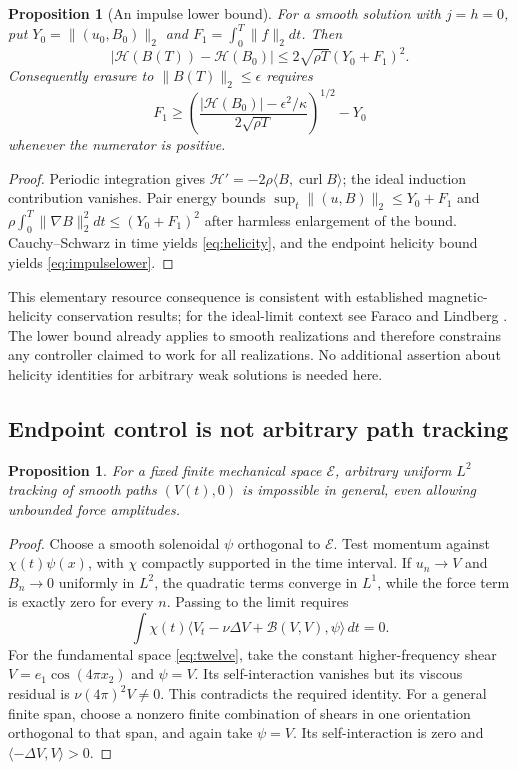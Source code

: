 \documentclass[11pt,a4paper]{amsart}
\newtheorem{proposition}[theorem]{Proposition}
\theoremstyle{definition}
\theoremstyle{remark}
\numberwithin{equation}{section}
\newcommand{\Bcal}{\mathcal B}
\newcommand{\ip}[2]{\langle #1,#2\rangle}
\newcommand{\norm}[1]{\lVert #1\rVert}
\newcommand{\curl}{\operatorname{curl}}
\begin{document}
\begin{proposition}[An impulse lower bound]\label{prop:helicity}
For a smooth solution with $j=h=0$, put
$Y_0=\norm{(u_0,B_0)}_2$ and $F_1=\int_0^T\norm f_2dt$. Then
\begin{equation}\label{eq:helicity}
 |\mathscr H(B(T))-\mathscr H(B_0)|
 \le2\sqrt{\rho T}(Y_0+F_1)^2.
\end{equation}
Consequently erasure to $\norm{B(T)}_2\le\epsilon$ requires
\begin{equation}\label{eq:impulselower}
 F_1\ge
 \left(\frac{|\mathscr H(B_0)|-\epsilon^2/\kappa}
                   {2\sqrt{\rho T}}\right)^{1/2}-Y_0
\end{equation}
whenever the numerator is positive.
\end{proposition}

\begin{proof}
Periodic integration gives
$\mathscr H'=-2\rho\ip B{\curl B}$; the ideal induction contribution vanishes. Pair energy bounds $\sup_t\norm{(u,B)}_2\le Y_0+F_1$ and
$\rho\int_0^T\norm{\nabla B}_2^2dt\le(Y_0+F_1)^2$ after harmless enlargement of the bound. Cauchy--Schwarz in time yields \eqref{eq:helicity}, and the endpoint helicity bound yields \eqref{eq:impulselower}.
\end{proof}

This elementary resource consequence is consistent with established magnetic-helicity conservation results; for the ideal-limit context see Faraco and Lindberg \cite{FL}. The lower bound already applies to smooth realizations and therefore constrains any controller claimed to work for all realizations. No additional assertion about helicity identities for arbitrary weak solutions is needed here.

\subsection{Endpoint control is not arbitrary path tracking}
\begin{proposition}\label{prop:tracking}
For a fixed finite mechanical space $\mathcal E$, arbitrary uniform $L^2$ tracking of smooth paths $(V(t),0)$ is impossible in general, even allowing unbounded force amplitudes.
\end{proposition}

\begin{proof}
Choose a smooth solenoidal $\psi$ orthogonal to $\mathcal E$. Test momentum against $\chi(t)\psi(x)$, with $\chi$ compactly supported in the time interval. If $u_n\to V$ and $B_n\to0$ uniformly in $L^2$, the quadratic terms converge in $L^1$, while the force term is exactly zero for every $n$. Passing to the limit requires
\[
 \int\chi(t)\ip{V_t-\nu\Delta V+\Bcal(V,V)}\psi\,dt=0.
\]
For the fundamental space \eqref{eq:twelve}, take the constant higher-frequency shear
$V=e_1\cos(4\pi x_2)$ and $\psi=V$. Its self-interaction vanishes but its viscous residual is $\nu(4\pi)^2V\ne0$. This contradicts the required identity. For a general finite span, choose a nonzero finite combination of shears in one orientation orthogonal to that span, and again take $\psi=V$. Its self-interaction is zero and $\ip{-\Delta V}V>0$.
\end{proof}
\end{document}
